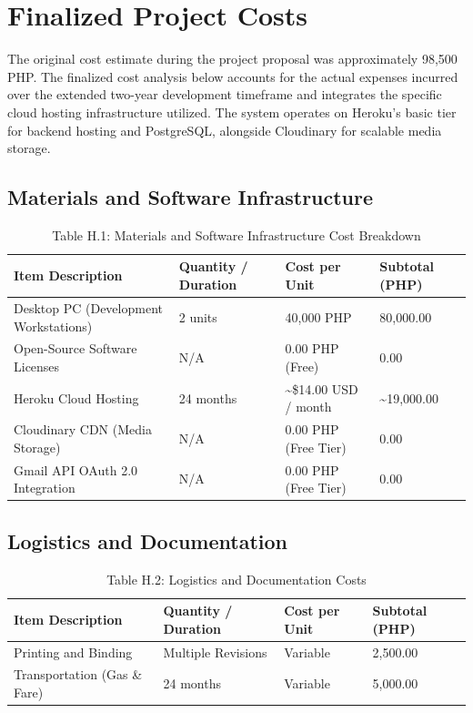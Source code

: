 
\chapter{Finalized Project Costs}
\label{appendix:cost_estimates}

The original cost estimate during the project proposal was approximately 98,500 PHP. The finalized cost analysis below accounts for the actual expenses incurred over the extended two-year development timeframe and integrates the specific cloud hosting infrastructure utilized. The system operates on Heroku's basic tier for backend hosting and PostgreSQL, alongside Cloudinary for scalable media storage.

\section{Materials and Software Infrastructure}

\begin{table}[H]
\centering
\caption*{Table H.1: Materials and Software Infrastructure Cost Breakdown}
\begin{tabular}{|p{4.5cm}|p{3cm}|p{3cm}|p{2.5cm}|}
\hline
\textbf{Item Description} & \textbf{Quantity / Duration} & \textbf{Cost per Unit} & \textbf{Subtotal (PHP)} \\ \hline
Desktop PC (Development Workstations) & 2 units & 40,000 PHP & 80,000.00 \\ \hline
Open-Source Software Licenses & N/A & 0.00 PHP (Free) & 0.00 \\ \hline
Heroku Cloud Hosting & 24 months & \textasciitilde\$14.00 USD / month & \textasciitilde 19,000.00 \\ \hline
Cloudinary CDN (Media Storage) & N/A & 0.00 PHP (Free Tier) & 0.00 \\ \hline
Gmail API OAuth 2.0 Integration & N/A & 0.00 PHP (Free Tier) & 0.00 \\ \hline
\end{tabular}
\end{table}

\section{Logistics and Documentation}

\begin{table}[H]
\centering
\caption*{Table H.2: Logistics and Documentation Costs}
\begin{tabular}{|p{4.5cm}|p{3cm}|p{3cm}|p{2.5cm}|}
\hline
\textbf{Item Description} & \textbf{Quantity / Duration} & \textbf{Cost per Unit} & \textbf{Subtotal (PHP)} \\ \hline
Printing and Binding & Multiple Revisions & Variable & 2,500.00 \\ \hline
Transportation (Gas \& Fare) & 24 months & Variable & 5,000.00 \\ \hline
\end{tabular}
\end{table}

